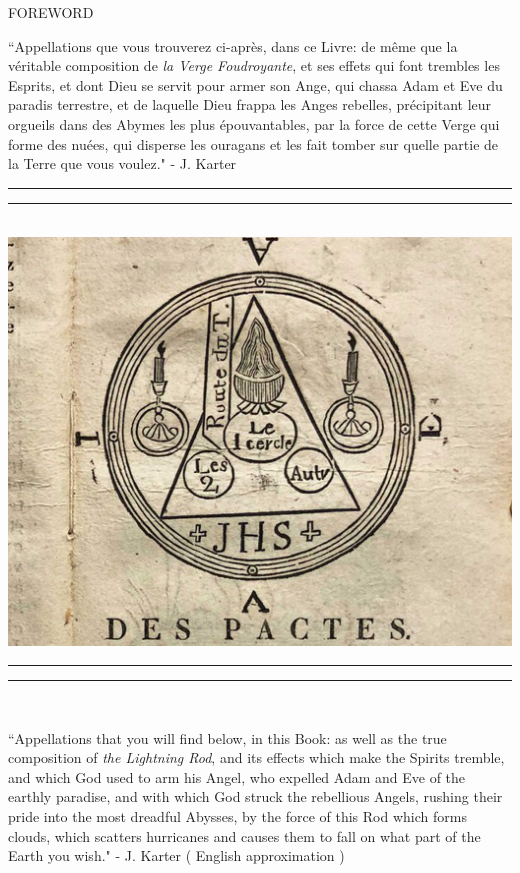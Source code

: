 \documentclass[11pt]{article}
\begin{document}
\begin{center}
\huge FOREWORD
\end{center}

\begingroup
\begin{center}
``Appellations que vous trouverez ci-après, dans ce Livre: de même que la véritable composition de \textit{la Verge Foudroyante}, et ses effets qui font trembles les Esprits, et dont Dieu se servit pour armer son Ange, qui chassa Adam et Eve du paradis terrestre, et de laquelle Dieu frappa les Anges rebelles, précipitant leur orgueils dans des Abymes les plus épouvantables, par la force de cette Verge qui forme des nuées, qui disperse les ouragans et les fait tomber sur quelle partie de la Terre que vous voulez."
\rightskip\leftskip
\phantom{text} \hfill - J. Karter
\end{center}
\endgroup


\begingroup
\begin{center}
\rule{\textwidth}{1.6pt}\vspace*{-\baselineskip}\vspace*{1pt}
\rule{\textwidth}{0.4pt}\\[\baselineskip]
\includegraphics[scale=0.20]{verge.jpeg}
\rule{\textwidth}{0.4pt}\vspace*{-\baselineskip}\vspace{2pt}
\rule{\textwidth}{1.6pt}\\[\baselineskip]
\end{center}
\endgroup

\begingroup
\begin{center}
``Appellations that you will find below, in this Book: as well as the true composition of \textit{the Lightning Rod}, and its effects which make the Spirits tremble, and which God used to arm his Angel, who expelled Adam and Eve of the earthly paradise, and with which God struck the rebellious Angels, rushing their pride into the most dreadful Abysses, by the force of this Rod which forms clouds, which scatters hurricanes and causes them to fall on what part of the Earth you wish."
\rightskip\leftskip
\phantom{text} \hfill - J. Karter ( English approximation )
\end{center}
\endgroup
\end{document}
